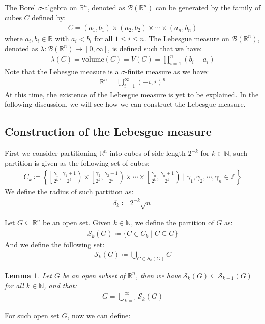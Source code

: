 \documentclass[11pt]{book}
\theoremstyle{break}
\theoremstyle{break}
\newtheorem{lem}{Lemma}[thm]
\newcommand{\R}{\mathbb{R}}
\newcommand{\N}{\mathbb{N}}
\newcommand{\Z}{\mathbb{Z}}
\begin{document}
The Borel $\sigma$-algebra on $\R^n$, denoted as $\mathcal{B}(\R^n)$ can be generated by the family of cubes $C$ defined by:
\begin{align*}
C = (a_1,b_1)\times (a_2,b_2) \times \cdots \times (a_n,b_n)
\end{align*}
where $a_i,b_i \in \R$ with $a_i < b_i$ for all $1\leq i\leq n$. The Lebesgue measure on $\mathcal{B}(\R^n)$, denoted as $\lambda:\mathcal{B}(\R^n) \to [0,\infty]$, is defined such that we have:
\begin{align*}
\lambda(C) = \text{volume}(C) = V(C) = \prod_{i=1}^n (b_i-a_i)
\end{align*}
Note that the Lebesgue measure is a $\sigma$-finite measure as we have:
\begin{align*}
\R^n = \bigcup_{i=1}^\infty (-i,i)^n
\end{align*}
At this time, the existence of the Lebesgue measure is yet to be explained. In the following discussion, we will see how we can construct the Lebesgue measure.\\

\subsection*{Construction of the Lebesgue measure}
First we consider partitioning $\R^n$ into cubes of side length $2^{-k}$ for $k \in \N$, such partition is given as the following set of cubes:
\begin{align*}
C_k \coloneqq \left\{\left[\frac{\gamma_1}{2^k}, \frac{\gamma_1+1}{2^k}\right)\times \left[\frac{\gamma_2}{2^k}, \frac{\gamma_2+1}{2^k}\right)\times \cdots \times \left[\frac{\gamma_n}{2^k}, \frac{\gamma_n+1}{2^k}\right)\mid \gamma_1,\gamma_2,\cdots,\gamma_n \in \Z \right\}
\end{align*}
We define the radius of such partition as:
\begin{align*}
\delta_k \coloneqq 2^{-k}\sqrt{n}
\end{align*}


Let $G \subseteq \R^n$ be an open set. Given $k \in \N$, we define the partition of $G$ as: 
\begin{align*}
S_k(G) \coloneqq \{ C \in C_k \mid \bar{C} \subseteq G\}
\end{align*}
And we define the following set:
\begin{align*}
\mathcal{S}_k(G) \coloneqq \bigcup_{C \in S_k(G)}C
\end{align*}
\begin{lem}
Let $G$ be an open subset of $\R^n$, then we have $\mathcal{S}_k(G) \subseteq \mathcal{S}_{k+1}(G)$ for all $k \in \N$, and that:
\begin{align*}
G = \bigcup_{k=1}^\infty \mathcal{S}_k (G)
\end{align*}
\end{lem}
For such open set $G$, now we can define:
\end{document}
